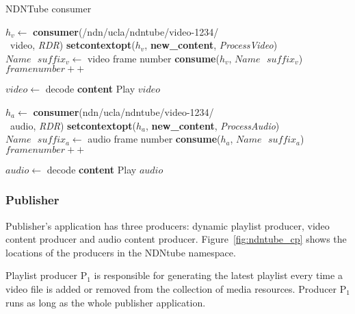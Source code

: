 \begin{algorithm}[ht]
\caption{NDNTube consumer}
\label{alg:recordconsumer}
\begin{algorithmic}[4]
\State $h_v \leftarrow $ \textbf{consumer}(/ndn/ucla/ndntube/video-1234/ \\\ video, \textit{RDR})
\State \textbf{setcontextopt}($h_v$, \textbf{new\_content}, \textit{ProcessVideo})
\vspace{0.2cm}
	\State $Name \textbf{ } suffix_v \leftarrow $ video frame number
	\State \textbf{consume}($h_v$, $Name\textbf{ }suffix_v$)
	\State $framenumber ++$
	\EndWhile
\vspace{0.2cm}

   \State $video \leftarrow $ decode \textbf{content}
   \State Play $video$
\EndFunction

\vspace{0.4cm}

\State $h_a \leftarrow $ \textbf{consumer}(ndn/ucla/ndntube/video-1234/ \\\ audio, \textit{RDR})
\State \textbf{setcontextopt}($h_a$, \textbf{new\_content}, \textit{ProcessAudio})
\vspace{0.2cm}
	\State $Name \textbf{ } suffix_a \leftarrow $ audio frame number
	\State \textbf{consume}($h_a$, $Name\textbf{ }suffix_a$)
	\State $framenumber ++$
	\EndWhile
\vspace{0.2cm}

   	\State $audio \leftarrow $ decode \textbf{content}
   	\State Play $audio$
\EndFunction
\end{algorithmic}
\end{algorithm}

\subsubsection{Publisher}
Publisher's application has three producers: dynamic playlist producer, video content producer and audio content producer. Figure~\ref{fig:ndntube_cp} shows the locations of the producers in the NDNtube namespace.

Playlist producer P$_{\text{1}}$ is responsible for generating the latest playlist every time a video file is added or removed from the collection of media resources. Producer P$_{\text{1}}$ runs as long as the whole publisher application.

